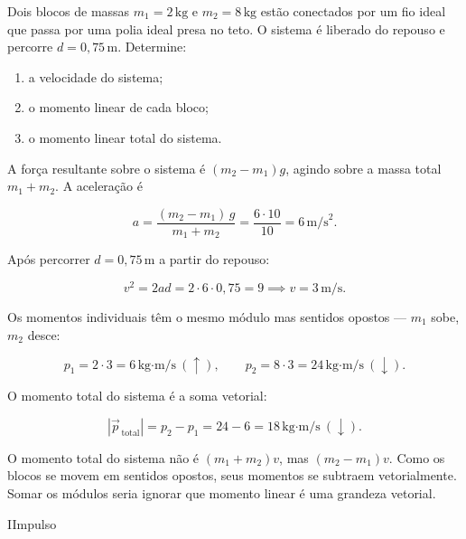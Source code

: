 \begin{exemplo}\label{exemplo_newton_momentumex03}

Dois blocos de massas $m_1 = 2\,\text{kg}$ e $m_2 = 8\,\text{kg}$ estão
conectados por um fio ideal que passa por uma polia ideal presa no teto. O sistema é
liberado do repouso e percorre $d = 0{,}75\,\text{m}$. Determine:

\begin{enumerate}
     \item [a)] a velocidade do sistema;
     \item [b)] o momento linear de cada bloco;
     \item [c)] o momento linear total do sistema.
\end{enumerate}


\resolucao

A força resultante sobre o sistema é $(m_2 - m_1)g$, agindo sobre a massa total
$m_1+m_2$. A aceleração é

$$ a = \frac{(m_2-m_1)\,g}{m_1+m_2} = \frac{6\cdot10}{10} = 6\,\text{m/s}^2. $$

Após percorrer $d = 0{,}75\,\text{m}$ a partir do repouso:

$$ v^2 = 2ad = 2\cdot6\cdot0{,}75 = 9 \implies v = 3\,\text{m/s}. $$

Os momentos individuais têm o mesmo módulo mas sentidos opostos ---
$m_1$ sobe, $m_2$ desce:

$$ p_1 = 2\cdot 3= 6\,\text{kg·m/s}\ (\uparrow), \qquad
   p_2 = 8\cdot 3= 24\,\text{kg·m/s}\ (\downarrow). $$

O momento total do sistema é a soma vetorial:

$$ |\vec{p}_{\,\text{total}} |= p_2 - p_1 = 24 - 6 = \boxed{18\,\text{kg·m/s}\ (\downarrow).} $$

O momento total do sistema não é $(m_1+m_2)v$, mas $(m_2-m_1)v$. Como os
blocos se movem em sentidos opostos, seus momentos se subtraem vetorialmente. Somar os módulos seria ignorar que momento linear é uma grandeza vetorial.



\end{exemplo}

\vspace{0.3cm}






\begin{secnivel}[Impulso]{I}{Impulso}
  

\end{secnivel}








